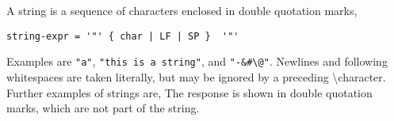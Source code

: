 A string is a sequence of characters enclosed in double quotation marks,
%
 \begin{lstlisting}[language=EBNF]
   string-expr = '"' { char | LF | SP }  '"'
\end{lstlisting}
% 
Examples are \lstinline{"a"}, \lstinline{"this is a string"}, and \lstinline{"-&#\@"}. Newlines and following whitespaces are taken literally, but may be ignored by a preceding \textbackslash character. Further examples of strings are,
%
%
The response is shown in double quotation marks, which are not part of the string. 

